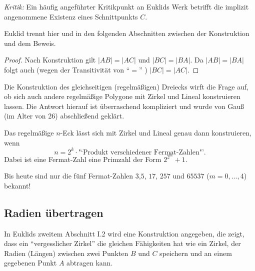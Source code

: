 \begin{center}
    
\end{center}

{\em Kritik:} Ein häufig angeführter Kritikpunkt an Euklids Werk betrifft die implizit angenommene
Existenz eines Schnittpunkts $C$.


Euklid trennt hier und in den folgenden Abschnitten zwischen der Konstruktion und dem Beweis.

\begin{proof}
    Nach Konstruktion gilt $|AB|=|AC|$ und $|BC|=|BA|$.
    Da $|AB|=|BA|$ folgt auch (wegen der Transitivität von "`$=$"' ) $|BC|=|AC|$.
\end{proof}

Die Konstruktion des gleichseitigen (regelmäßigen) Dreiecks wirft die Frage auf, ob sich auch andere
regelmäßige Polygone mit Zirkel und Lineal konstruieren lassen. Die Antwort hierauf ist überraschend
kompliziert und wurde von Gauß (im Alter von 26)
abschließend geklärt.

\begin{thm}[Gauß, 1801]  %
    Das regelmäßige $n$-Eck lässt sich mit Zirkel und Lineal genau dann konstruieren, wenn
    $$
        n = 2^k \cdot \mbox{"`Produkt verschiedener Fermat-Zahlen"'}.
    $$
    Dabei ist eine Fermat-Zahl eine Primzahl der Form $2^{2^m}+1$.
\end{thm}

Bis heute sind nur die fünf Fermat-Zahlen $3$,$5$, $17$, $257$ und $65537$ ($m=0,\ldots,4$) bekannt!

\subsection*{Radien übertragen}

In Euklids zweitem Abschnitt I.2 wird eine Konstruktion angegeben, die zeigt, dass ein
"`vergesslicher Zirkel"' die gleichen Fähigkeiten hat wie ein Zirkel, der Radien (Längen) zwischen
zwei Punkten $B$ und $C$ speichern und an einem gegebenen Punkt $A$ abtragen kann.

